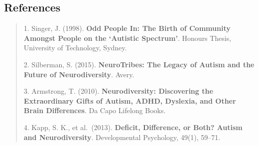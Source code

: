 \documentclass[
  letterpaper,
  DIV=11,
  numbers=noendperiod]{scrreprt}
\begin{document}
\subsection{\texorpdfstring{\textbf{References}}{References}}\label{references}

\begin{quote}
1. Singer, J. (1998). \textbf{Odd People In: The Birth of Community
Amongst People on the `Autistic Spectrum'}. Honours Thesis, University
of Technology, Sydney.

2. Silberman, S. (2015). \textbf{NeuroTribes: The Legacy of Autism and
the Future of Neurodiversity}. Avery.

3. Armstrong, T. (2010). \textbf{Neurodiversity: Discovering the
Extraordinary Gifts of Autism, ADHD, Dyslexia, and Other Brain
Differences}. Da Capo Lifelong Books.

4. Kapp, S. K., et al.~(2013). \textbf{Deficit, Difference, or Both?
Autism and Neurodiversity}. Developmental Psychology, 49(1), 59--71.
\end{quote}
\end{document}
